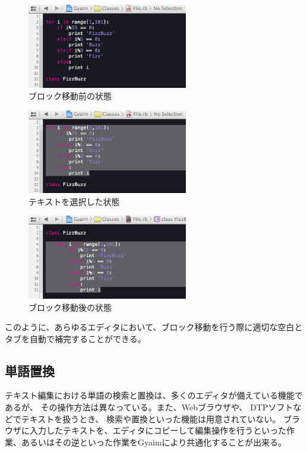 \begin{figure}[H]
\centerline{\includegraphics[width=70mm,bb=0 0 360 190]{figures/indent1.png}}
\caption{ブロック移動前の状態}
\label{indent1}
\end{figure}

\begin{figure}[H]
\centerline{\includegraphics[width=70mm,bb=0 0 360 190]{figures/indent2.png}}
\caption{テキストを選択した状態}
\label{indent2}
\end{figure}

\begin{figure}[H]
\centerline{\includegraphics[width=70mm,bb=0 0 360 190]{figures/indent3.png}}
\caption{ブロック移動後の状態}
\label{indent3}
\end{figure}

このように、あらゆるエディタにおいて、ブロック移動を行う際に適切な空白とタブを自動で補完することができる。

\subsection{単語置換}
テキスト編集における単語の検索と置換は、多くのエディタが備えている機能であるが、
その操作方法は異なっている。また、Webブラウザや、
DTPソフトなどでテキストを扱うとき、
検索や置換といった機能は用意されていない。
ブラウザに入力したテキストを、エディタにコピーして編集操作を行うといった作業、あるいはその逆といった作業をGyaimにより共通化することが出来る。

